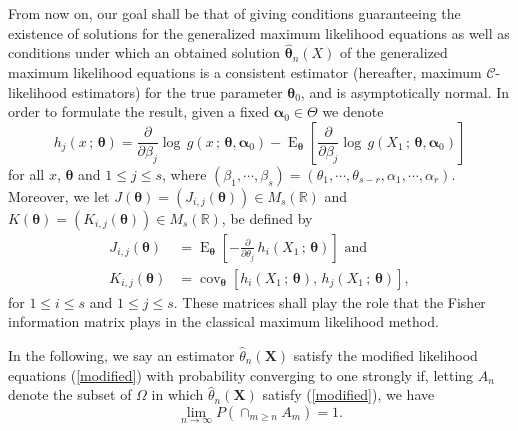\documentclass[10pt,a4paper,onecolumn]{article} %
\newtheorem{definition}[theorem]{Definition}
\newcommand{\bs}{\boldsymbol}
\newcommand{\on}{\operatorname}
\begin{document}
From now on, our goal shall be that of giving conditions guaranteeing the existence of solutions for the generalized maximum likelihood equations as well as conditions under which an obtained solution $\bs{\hat{\theta}}_n(X)$ of the generalized maximum likelihood equations is a consistent estimator (hereafter, maximum $\mathcal{C}$-likelihood estimators) for the true parameter $\bs{\theta}_0$, and is asymptotically normal. In order to formulate the result, given a fixed $\bs{\alpha}_0\in \Theta$ we denote
\begin{equation}\label{defh}
h_j(x\,;\,\bs{\theta}) = \frac{\partial}{\partial \beta_j}\log\, g \left(x\,;\,\bs{\theta},\bs{\alpha}_0\right) - \on{E}_{\bs{\theta}}\left[\frac{\partial}{\partial \beta_j}\log\, g \left(X_1\,;\,\bs{\theta},\bs{\alpha}_0\right)\right]
\end{equation}
for all $x$, $\bs{\theta}$ and $1\leq j\leq s$, where $(\beta_1,\cdots,\beta_s)=(\theta_1,\cdots,\theta_{s-r},\alpha_1,\cdots,\alpha_r)$. Moreover, we let $J(\bs{\theta})=\left(J_{i,j}(\bs{\theta})\right)\in M_{s}(\mathbb{R})$ and $K(\bs{\theta})=\left(K_{i,j}(\bs{\theta})\right)\in M_{s}(\mathbb{R})$, be defined by
 \begin{equation}\label{eqj}
 \begin{aligned}J_{i,j}(\bs{\theta})&=
 \on{E}_{\bs{\theta}} \left[-\frac{\partial}{\partial\theta_j}\, h_i(X_1\, ;\, \bs{\theta})\right]\mbox{ and}\\
 K_{i,j}(\bs{\theta}) &=  \on{cov}_{\bs{\theta}} \left[h_i(X_1\, ;\, \bs{\theta}),\,  h_j(X_1\, ;\, \bs{\theta})\right],
 \end{aligned}
 \end{equation}
 for $1\leq i\leq s$ and $1\leq j\leq s$. These matrices shall play the role that the Fisher information matrix plays in the classical maximum likelihood method.


In the following, we say an estimator $\hat{\theta}_n(\bs{X})$ satisfy the modified likelihood equations (\ref{modified}) with probability converging to one strongly if, letting $A_n$ denote the subset of $\Omega$ in which $\hat{\theta}_n(\bs{X})$ satisfy (\ref{modified}), we have
\begin{equation}\label{PA_mhappen} \lim_{n\to \infty} P(\cap_{m\geq n} A_m) = 1.
\end{equation}
\end{document}
